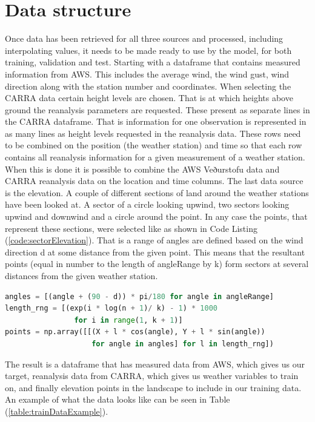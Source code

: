 \section{Data structure}

Once data has been retrieved for all three sources and processed, including interpolating values, it needs to be made ready to use by the model, for both training, validation and test. Starting with a dataframe that contains measured information from AWS. This includes the average wind, the wind gust, wind direction along with the station number and coordinates. When selecting the CARRA data certain height levels are chosen. That is at which heights above ground the reanalysis parameters are requested. These present as separate lines in the CARRA dataframe. That is information for one observation is represented in as many lines as height levels requested in the reanalysis data. These rows need to be combined on the position (the weather station) and time so that each row contains all reanalysis information for a given measurement of a weather station. When this is done it is possible to combine the AWS Veðurstofu data and CARRA reanalysis data on the location and time columns. The last data source is the elevation. A couple of different sections of land around the weather stations have been looked at. A sector of a circle looking upwind, two sectors looking upwind and downwind and a circle around the point. In any case the points, that represent these sections, were selected like as shown in Code Listing (\ref{code:sectorElevation}). That is a range of angles are defined based on the wind direction d at some distance from the given point. This means that the resultant points (equal in number to the length of angleRange by k) form sectors at several distances from the given weather station.

\begin{lstlisting}[language = Python, caption = {Sector elevation points generated}, label = code:sectorElevation]
angles = [(angle + (90 - d)) * pi/180 for angle in angleRange]
length_rng = [(exp(i * log(n + 1)/ k) - 1) * 1000 
                for i in range(1, k + 1)]
points = np.array([[(X + l * cos(angle), Y + l * sin(angle))
                    for angle in angles] for l in length_rng])   
\end{lstlisting}

The result is a dataframe that has measured data from AWS, which gives us our target, reanalysis data from CARRA, which gives us weather variables to train on, and finally elevation points in the landscape to include in our training data. An example of what the data looks like can be seen in Table (\ref{table:trainDataExample}).

